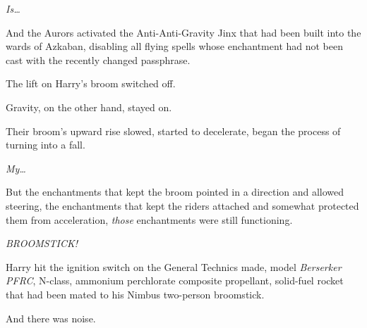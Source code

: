 \emph{Is…}

And the Aurors activated the Anti-Anti-Gravity Jinx that had been built into
the wards of Azkaban, disabling all flying spells whose enchantment had not
been cast with the recently changed passphrase.

The lift on Harry’s broom switched off.

Gravity, on the other hand, stayed on.

Their broom’s upward rise slowed, started to decelerate, began the process of
turning into a fall.

\emph{My…}

But the enchantments that kept the broom pointed in a direction and allowed
steering, the enchantments that kept the riders attached and somewhat protected
them from acceleration, \emph{those} enchantments were still functioning.

\emph{BROOMSTICK!}

Harry hit the ignition switch on the General Technics made, model
\emph{Berserker PFRC}, N-class, ammonium perchlorate composite propellant,
solid-fuel rocket that had been mated to his Nimbus  two-person broomstick.

And there was noise.
